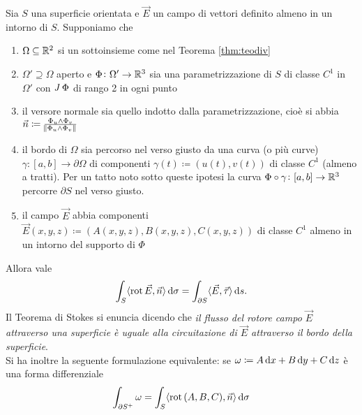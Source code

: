 \begin{thm}[Stokes]
	Sia $ S $ una superficie orientata e $ \vec{E} $ un campo di vettori definito almeno in un intorno di $ S $. Supponiamo che 
	\begin{enumerate}[label = (\roman*)]
		\item $ \Omega \subseteq \mathbb{R}^2 $ si un sottoinsieme come nel Teorema \ref{thm:teodiv}
		\item $ \Omega' \supseteq \Omega $ aperto e $ \Phi \colon \Omega' \to \mathbb{R}^3 $ sia una parametrizzazione di $ S $ di classe $ C^1 $ in $ \Omega' $ con $ \operatorname{\mathit{J}}{\Phi} $ di rango 2 in ogni punto
		\item il versore normale sia quello indotto dalla parametrizzazione, cioè si abbia $ \vec{n} \coloneqq \frac{\Phi_u \wedge \Phi_v}{\norm{\Phi_u \wedge \Phi_v}} $
		\item il bordo di $ \Omega $ sia percorso nel verso giusto da una curva (o più curve) $ \gamma\colon [a, b] \to \partial \Omega $ di componenti $ \gamma(t) \coloneqq (u(t), v(t)) $ di classe $ C^1 $ (almeno a tratti). Per un tatto noto sotto queste ipotesi la curva $ \Phi \circ \gamma \colon [a, b] \to \mathbb{R}^3 $ percorre $ \partial S $ nel verso giusto.
		\item il campo $ \vec{E} $ abbia componenti $ \vec{E}(x, y, z) \coloneqq (A(x, y, z), B(x, y, z), C(x, y, z)) $ di classe $ C^1 $ almeno in un intorno del supporto di $ \Phi $
	\end{enumerate}
	Allora vale
	\begin{equation}
		\int_{S} \langle {\rot{\vec{E}}, \vec{n}} \rangle \dif{\sigma} = \int_{\partial S} \langle {\vec{E}, \vec{\tau}} \rangle \dif{s}.
	\end{equation}
	Il Teorema di Stokes si enuncia dicendo che \emph{il flusso del rotore campo $ \vec{E} $ attraverso una superficie è uguale alla circuitazione di $ \vec{E} $ attraverso il bordo della superficie}. \\
	Si ha inoltre la seguente formulazione equivalente: se $ \omega \coloneqq A \dif{x} + B \dif{y} + C \dif{z} $ è una forma differenziale  
	\begin{equation}
		\int_{\partial S^+} \omega = \int_{S} \langle {\rot{(A, B, C)}, \vec{n}} \rangle \dif{\sigma}
	\end{equation}
\end{thm}
%
